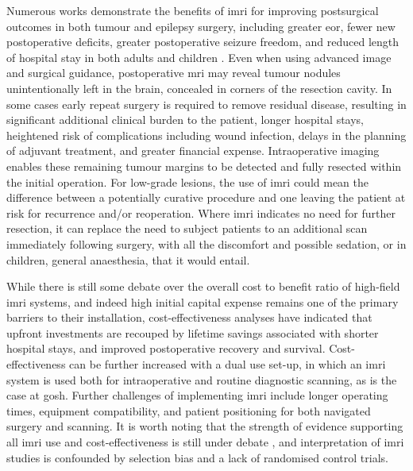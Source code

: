 \documentclass[12pt,phd,a4paper,twoside]{ucl_thesis}
\begin{document}
Numerous works demonstrate the benefits of \gls{imri} for improving postsurgical outcomes in both tumour and epilepsy surgery, including greater \gls{eor}, fewer new postoperative deficits, greater postoperative seizure freedom, and reduced length of hospital stay in both adults and children
\autocite{Shah2012,Zhang2015a,Sacino2016,Rao2017c,Giordano2017,Lu2018a,Garzon-Muvdi2019,Leroy2019,Karsy2019,Golub2020,Hlavac2020,Englman2021}.
Even when using advanced image and surgical guidance, postoperative \gls{mri} may reveal tumour nodules unintentionally left in the brain, concealed in corners of the resection cavity.
In some cases early repeat surgery is required to remove residual disease, resulting in significant additional clinical burden to the patient, longer hospital stays, heightened risk of complications including wound infection\autocite{Tenney1985,Chang2003}, delays in the planning of adjuvant treatment, and greater financial expense\autocite{Shah2012}.
Intraoperative imaging enables these remaining tumour margins to be detected and fully resected within the initial operation\autocite{Sattur2019,Hlavac2020}.
For low-grade lesions, the use of \gls{imri} could mean the difference between a potentially curative procedure and one leaving the patient at risk for recurrence and/or reoperation\autocite{Shah2012}.
Where \gls{imri} indicates no need for further resection, it can replace the need to subject patients to an additional scan immediately following surgery, with all the discomfort and possible sedation, or in children, general anaesthesia, that it would entail.

While there is still some debate over the overall cost to benefit ratio of high-field \gls{imri} systems\autocite{Eljamel2016,Giordano2016a,Giussani2022}, and indeed high initial capital expense remains one of the primary barriers to their installation\autocite{NICE2021}, cost-effectiveness analyses have indicated that upfront investments are recouped by lifetime savings associated with shorter hospital stays, and improved postoperative recovery and survival\autocite{Giordano2016a,Sacino2018}.
Cost-effectiveness can be further increased with a dual use set-up, in which an \gls{imri} system is used both for intraoperative and routine diagnostic scanning\autocite{Giordano2016a}, as is the case at \gls{gosh}.
Further challenges of implementing \gls{imri} include longer operating times, equipment compatibility, and patient positioning for both navigated surgery and scanning\autocite{Giordano2017}.
It is worth noting that the strength of evidence supporting all \gls{imri} use and cost-effectiveness is still under debate \autocite{Jenkinson2018,Garzon-Muvdi2019,Caras2020}, and interpretation of \gls{imri} studies is confounded by selection bias and a lack of randomised control trials\autocite{Kubben2011}.
\end{document}
